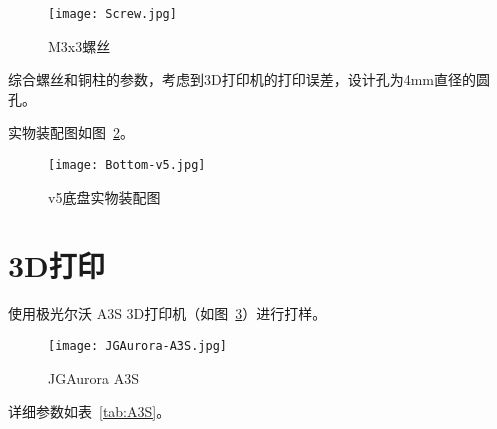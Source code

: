 \begin{figure}[htbp]
    \centering
    \texttt{[image: Screw.jpg]}
    \caption{M3x3螺丝}
    \label{fig:Screw}
\end{figure}

综合螺丝和铜柱的参数，考虑到3D打印机的打印误差，设计孔为4mm直径的圆孔。

实物装配图如图~\ref{fig:Bottom-v5}。

\begin{figure}[htbp]
    \centering
    \texttt{[image: Bottom-v5.jpg]}
    \caption{v5底盘实物装配图}
    \label{fig:Bottom-v5}
\end{figure}

\section{3D打印}

使用极光尔沃 A3S 3D打印机（如图~\ref{fig:A3S}）进行打样。

\begin{figure}[htbp]
    \centering
    \texttt{[image: JGAurora-A3S.jpg]}
    \caption{JGAurora A3S}
    \label{fig:A3S}
\end{figure}

详细参数如表~\ref{tab:A3S}。

